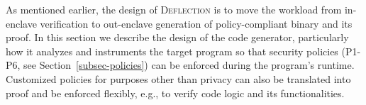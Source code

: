 As mentioned earlier, the design of \textsc{Deflection} is to move the workload from in-enclave verification to out-enclave generation of policy-compliant binary and its proof. 
In this section we describe the design of the code generator, particularly how it analyzes and instruments the target program so that security policies (P1-P6, see Section~\ref{subsec-policies}) can be enforced during the program's runtime. Customized policies for purposes other than privacy can also be translated into proof and be enforced flexibly, e.g., to verify code logic and its functionalities.




 




